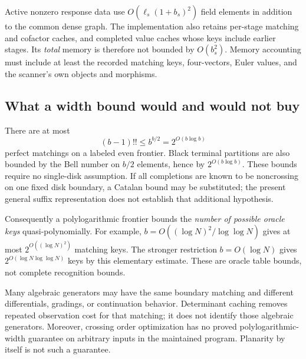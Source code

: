 Active nonzero response data use $O(\ell_s(1+b_s)^2)$ field elements in addition
to the common dense graph. The implementation also retains per-stage matching
and cofactor caches, and completed value caches whose keys include earlier
stages. Its \emph{total} memory is therefore not bounded by $O(b_s^2)$.
Memory accounting must include at least the recorded matching keys, four-vectors,
Euler values, and the scanner's own objects and morphisms.

\subsection{What a width bound would and would not buy}

There are at most
\[
                 (b-1)!!\le b^{b/2}=2^{O(b\log b)}
\]
perfect matchings on a labeled even frontier. Black terminal partitions are
also bounded by the Bell number on $b/2$ elements, hence by
$2^{O(b\log b)}$. These bounds require no single-disk assumption. If all
completions are known to be noncrossing on one fixed disk boundary, a Catalan
bound may be substituted; the present general suffix representation does not
establish that additional hypothesis.

Consequently a polylogarithmic frontier bounds the \emph{number of possible
oracle keys} quasi-polynomially. For example,
$b=O((\log N)^2/\log\log N)$ gives at most $2^{O((\log N)^2)}$ matching keys.
The stronger restriction $b=O(\log N)$ gives
$2^{O(\log N\log\log N)}$ keys by this elementary estimate. These are oracle
table bounds, not complete recognition bounds.

Many algebraic generators may have the same boundary matching and different
differentials, gradings, or continuation behavior. Determinant caching removes
repeated observation cost for that matching; it does not identify those
algebraic generators. Moreover, crossing order optimization has no proved
polylogarithmic-width guarantee on arbitrary inputs in the maintained program.
Planarity by itself is not such a guarantee.

